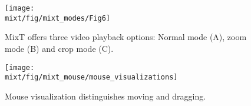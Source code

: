 \begin{figure*}[t]
  \centering
  \texttt{[image: \\mixt/fig/mixt\_modes/Fig6]}
  \caption{MixT offers three video playback options: Normal mode (A), zoom mode (B) and crop mode (C).}
  \label{fig:mixt_modes}
\end{figure*}

\begin{figure*}[t]
  \centering
  \texttt{[image: \\mixt/fig/mixt\_mouse/mouse\_visualizations]}
  \caption{Mouse visualization distinguishes moving and dragging.}
  \label{fig:mixt_mouse}
\end{figure*}
